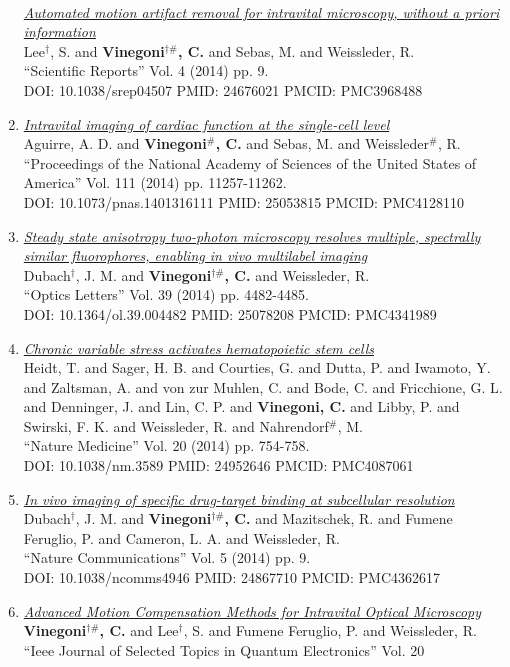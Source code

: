 \documentclass{resume}
\begin{document}
\begin{category}{~~}
\begin{enumerate}
\href{https://cvinegoni.github.io/assets/pdf/papers/2014-SR.pdf}{\it  Automated motion artifact removal for intravital microscopy, without a priori information} \\ Lee$^\dag$, S. and {\bf Vinegoni$^{\dag \#}$, C.} and Sebas, M. and Weissleder, R. \\ ``Scientific Reports'' Vol. 4 (2014) pp. 9. \\ DOI: 10.1038/srep04507 PMID: 24676021 PMCID: PMC3968488\item \href{https://cvinegoni.github.io/assets/pdf/papers/2014-PNAS.pdf}{\it  Intravital imaging of cardiac function at the single-cell level} \\ Aguirre, A. D. and {\bf Vinegoni$^\#$, C.} and Sebas, M. and Weissleder$^\#$, R. \\ ``Proceedings of the National Academy of Sciences of the United States of America'' Vol. 111 (2014) pp. 11257-11262. \\ DOI: 10.1073/pnas.1401316111 PMID: 25053815 PMCID: PMC4128110\item \href{https://cvinegoni.github.io/assets/pdf/papers/2014-OL.pdf}{\it  Steady state anisotropy two-photon microscopy resolves multiple, spectrally similar fluorophores, enabling in vivo multilabel imaging} \\ Dubach$^\dag$, J. M. and {\bf Vinegoni$^{\dag \#}$, C.} and Weissleder, R. \\ ``Optics Letters'' Vol. 39 (2014) pp. 4482-4485. \\ DOI: 10.1364/ol.39.004482 PMID: 25078208 PMCID: PMC4341989\item \href{https://cvinegoni.github.io/assets/pdf/papers/2014-NM.pdf}{\it  Chronic variable stress activates hematopoietic stem cells} \\ Heidt, T. and Sager, H. B. and Courties, G. and Dutta, P. and Iwamoto, Y. and Zaltsman, A. and von zur Muhlen, C. and Bode, C. and Fricchione, G. L. and Denninger, J. and Lin, C. P. and {\bf Vinegoni, C.} and Libby, P. and Swirski, F. K. and Weissleder, R. and Nahrendorf$^\#$, M. \\ ``Nature Medicine'' Vol. 20 (2014) pp. 754-758. \\ DOI: 10.1038/nm.3589 PMID: 24952646 PMCID: PMC4087061\item \href{https://cvinegoni.github.io/assets/pdf/papers/2014-NC.pdf}{\it  In vivo imaging of specific drug-target binding at subcellular resolution} \\ Dubach$^\dag$, J. M. and {\bf Vinegoni$^{\dag \#}$, C.} and Mazitschek, R. and Fumene Feruglio, P. and Cameron, L. A. and Weissleder, R. \\ ``Nature Communications'' Vol. 5 (2014) pp. 9. \\ DOI: 10.1038/ncomms4946 PMID: 24867710 PMCID: PMC4362617\item \href{https://cvinegoni.github.io/assets/pdf/papers/2014-IEEE.pdf}{\it  Advanced Motion Compensation Methods for Intravital Optical Microscopy} \\ {\bf Vinegoni$^{\dag \#}$, C.} and Lee$^\dag$, S. and Fumene Feruglio, P. and Weissleder, R. \\ ``Ieee Journal of Selected Topics in Quantum Electronics'' Vol. 20 
\end{enumerate}
\end{category}
\end{document}
